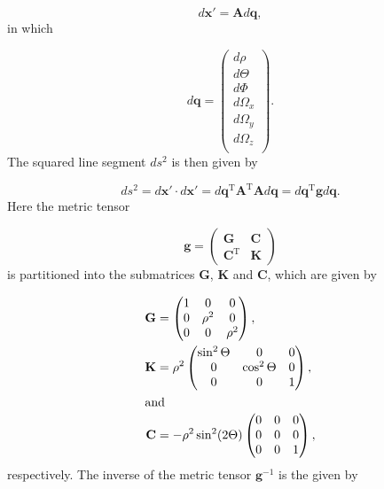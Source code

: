 \documentclass{article}
\numberwithin{equation}{section}
\numberwithin{figure}{section}
\begin{document}
\begin{equation}
d\mathbf{x}' = \mathbf{A}d\mathbf{q},
\end{equation} 
in which      

\begin{equation}
d\mathbf{q} =
\begin{pmatrix}
d\rho\\
d\Theta\\
d\Phi\\
d\Omega_x\\
d\Omega_y\\
d\Omega_z\\
\end{pmatrix}.
\end{equation}
The squared line segment $ds^2$ is then given by 

\begin{equation}
ds^2 = d\mathbf{x}' \cdot d\mathbf{x}' = d\mathbf{q}^{\mathrm{T}} \mathbf{A}^{\mathrm{T}} \mathbf{A}d\mathbf{q} = d\mathbf{q}^{\mathrm{T}} \mathbf{g} d\mathbf{q}.
\end{equation}
Here the metric tensor

\begin{equation}
\mathbf{g}=
\begin{pmatrix}
\mathbf{G} & \mathbf{C}\\
\mathbf{C}^\mathrm{T} & \mathbf{K}
\end{pmatrix}
\end{equation}
is partitioned into the submatrices $\mathbf{G}$, $\mathbf{K}$ and $\mathbf{C}$, which are given by 

\begin{align}
\mathbf{G} &=
\begin{pmatrix}
1 & 0      & 0\\
0 & \rho^2 & 0\\
0 & 0      & \rho^2
\end{pmatrix},\\
\mathbf{K} &=
\rho^2
\begin{pmatrix}
\sin^2\Theta & 0            & 0\\
0            & \cos^2\Theta & 0\\
0            & 0            & 1
\end{pmatrix},\\
\intertext{and}
\mathbf{C} &=
-\rho^2\sin^2(2\Theta)
\begin{pmatrix}
0 & 0 & 0\\
0 & 0 & 0\\
0 & 0 & 1
\end{pmatrix},
\end{align}
respectively. The inverse of the metric tensor $\mathbf{g}^{-1}$ is the given by
\end{document}
